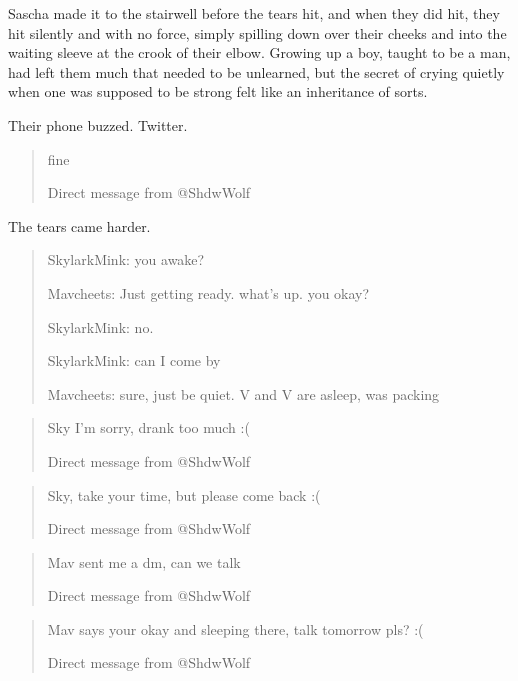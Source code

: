 \secdiv

Sascha made it to the stairwell before the tears hit, and when they did hit, they hit silently and with no force, simply spilling down over their cheeks and into the waiting sleeve at the crook of their elbow. Growing up a boy, taught to be a man, had left them much that needed to be unlearned, but the secret of crying quietly when one was supposed to be strong felt like an inheritance of sorts.

Their phone buzzed. Twitter.

\begin{quotation}
  fine

  Direct message from @ShdwWolf
\end{quotation}

The tears came harder.

\secdiv

\begin{quotation}
  SkylarkMink: you awake?

  Mavcheets: Just getting ready. what's up. you okay?

  SkylarkMink: no.

  SkylarkMink: can I come by

  Mavcheets: sure, just be quiet. V and V are asleep, was packing
\end{quotation}

\secdiv

\begin{quotation}
  Sky I'm sorry, drank too much :(

  Direct message from @ShdwWolf
\end{quotation}

\secdiv

\begin{quotation}
  Sky, take your time, but please come back :(

  Direct message from @ShdwWolf
\end{quotation}

\secdiv

\begin{quotation}
  Mav sent me a dm, can we talk

  Direct message from @ShdwWolf
\end{quotation}

\secdiv

\begin{quotation}
  Mav says your okay and sleeping there, talk tomorrow pls? :(

  Direct message from @ShdwWolf
\end{quotation}

